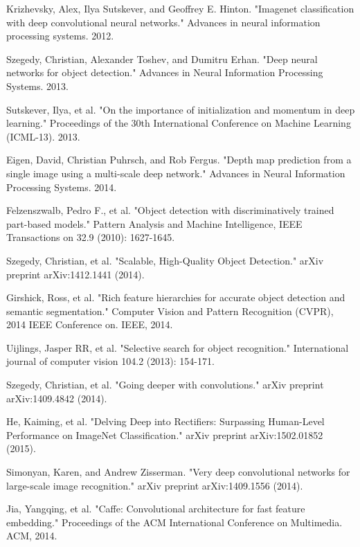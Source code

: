 \documentclass[journal]{IEEEtran}
\begin{document}
\begin{thebibliography}{1}
Krizhevsky, Alex, Ilya Sutskever, and Geoffrey E. Hinton. "Imagenet classification with deep convolutional neural networks." Advances in neural information processing systems. 2012.

Szegedy, Christian, Alexander Toshev, and Dumitru Erhan. "Deep neural networks for object detection." Advances in Neural Information Processing Systems. 2013.

Sutskever, Ilya, et al. "On the importance of initialization and momentum in deep learning." Proceedings of the 30th International Conference on Machine Learning (ICML-13). 2013.

Eigen, David, Christian Puhrsch, and Rob Fergus. "Depth map prediction from a single image using a multi-scale deep network." Advances in Neural Information Processing Systems. 2014.

Felzenszwalb, Pedro F., et al. "Object detection with discriminatively trained part-based models." Pattern Analysis and Machine Intelligence, IEEE Transactions on 32.9 (2010): 1627-1645.

Szegedy, Christian, et al. "Scalable, High-Quality Object Detection." arXiv preprint arXiv:1412.1441 (2014).

Girshick, Ross, et al. "Rich feature hierarchies for accurate object detection and semantic segmentation." Computer Vision and Pattern Recognition (CVPR), 2014 IEEE Conference on. IEEE, 2014.

Uijlings, Jasper RR, et al. "Selective search for object recognition." International journal of computer vision 104.2 (2013): 154-171.

Szegedy, Christian, et al. "Going deeper with convolutions." arXiv preprint arXiv:1409.4842 (2014).

He, Kaiming, et al. "Delving Deep into Rectifiers: Surpassing Human-Level Performance on ImageNet Classification." arXiv preprint arXiv:1502.01852 (2015).

Simonyan, Karen, and Andrew Zisserman. "Very deep convolutional networks for large-scale image recognition." arXiv preprint arXiv:1409.1556 (2014).

Jia, Yangqing, et al. "Caffe: Convolutional architecture for fast feature embedding." Proceedings of the ACM International Conference on Multimedia. ACM, 2014.

\end{thebibliography}
\end{document}
